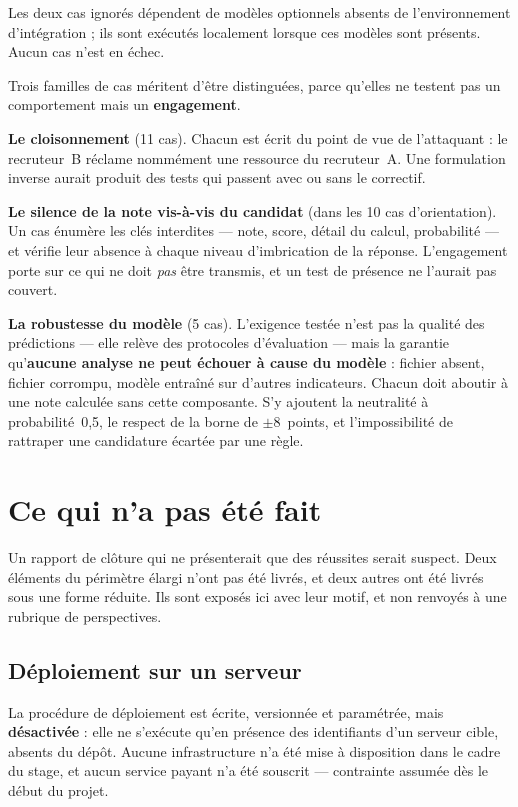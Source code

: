 \documentclass[11pt,a4paper]{article}
\begin{document}
\vspace{1mm}
\noindent Les deux cas ignorés dépendent de modèles optionnels absents de l'environnement d'intégration ; ils sont exécutés localement lorsque ces modèles sont présents. Aucun cas n'est en échec.

\vspace{2mm}
\noindent Trois familles de cas méritent d'être distinguées, parce qu'elles ne testent pas un comportement mais un \textbf{engagement}.

\medskip
\noindent\textbf{Le cloisonnement} (11 cas). Chacun est écrit du point de vue de l'attaquant : le recruteur~B réclame nommément une ressource du recruteur~A. Une formulation inverse aurait produit des tests qui passent avec ou sans le correctif.

\medskip
\noindent\textbf{Le silence de la note vis-à-vis du candidat} (dans les 10 cas d'orientation). Un cas énumère les clés interdites --- note, score, détail du calcul, probabilité --- et vérifie leur absence à chaque niveau d'imbrication de la réponse. L'engagement porte sur ce qui ne doit \emph{pas} être transmis, et un test de présence ne l'aurait pas couvert.

\medskip
\noindent\textbf{La robustesse du modèle} (5 cas). L'exigence testée n'est pas la qualité des prédictions --- elle relève des protocoles d'évaluation --- mais la garantie qu'\textbf{aucune analyse ne peut échouer à cause du modèle} : fichier absent, fichier corrompu, modèle entraîné sur d'autres indicateurs. Chacun doit aboutir à une note calculée sans cette composante. S'y ajoutent la neutralité à probabilité~0,5, le respect de la borne de $\pm$8~points, et l'impossibilité de rattraper une candidature écartée par une règle.

\section{Ce qui n'a pas été fait}\label{sec:perspectives}
Un rapport de clôture qui ne présenterait que des réussites serait suspect. Deux éléments du périmètre élargi n'ont pas été livrés, et deux autres ont été livrés sous une forme réduite. Ils sont exposés ici avec leur motif, et non renvoyés à une rubrique de perspectives.

\subsection{Déploiement sur un serveur}
La procédure de déploiement est écrite, versionnée et paramétrée, mais \textbf{désactivée} : elle ne s'exécute qu'en présence des identifiants d'un serveur cible, absents du dépôt. Aucune infrastructure n'a été mise à disposition dans le cadre du stage, et aucun service payant n'a été souscrit --- contrainte assumée dès le début du projet.
\end{document}
